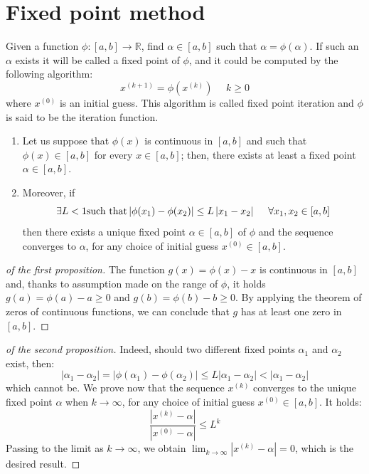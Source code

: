 \documentclass[12pt, a4paper]{report}
\begin{document}
    \section{Fixed point method}
    Given a function $\phi:[a,b] \rightarrow \mathbb{R}$, find $\alpha \in [a,b]$ such that $\alpha=\phi(\alpha)$. If such an $\alpha$ exists it will be called a fixed point of 
    $\phi$, and it could be computed by the following algorithm: 
    \[x^{(k+1)}=\phi(x^{(k)}) \:\:\:\:\:\: k \geq 0\]
    where $x^{(0)}$ is an initial guess. This algorithm is called fixed point iteration and $\phi$ is said to be the iteration function. 
    \begin{theorem}
        \begin{enumerate}
            \item Let us suppose that $\phi(x)$ is continuous in $[a,b]$ and such that $\phi(x) \in [a,b]$ for every $x \in [a,b]$; then, there exists at least a fixed point 
                $\alpha \in [a,b]$.
            \item Moreover, if 
                \[\exists L < 1 \textnormal{such that} \left\lvert \phi(x_1)-\phi(x_2) \right\rvert \leq L\left\lvert x_1-x_2 \right\rvert  \:\:\:\:\:\: \forall x_1,x_2 \in [a,b]\]
                then there exists a unique fixed point $\alpha \in [a,b]$ of $\phi$ and the sequence converges to $\alpha$, for any choice of initial guess $x^{(0)} \in [a,b]$.
        \end{enumerate}
    \end{theorem}
    \begin{proof}[of the first proposition]
        The function $g(x)= \phi(x)-x$ is continuous in $[a,b]$ and, thanks to assumption made on the range of $\phi$, it holds $g(a) = \phi(a)-a \geq 0$ and $g(b) = \phi(b)-b \geq 0$.
        By applying the theorem of zeros of continuous functions, we can conclude that $g$ has at least one zero in $[a,b]$. 
    \end{proof}
    \begin{proof}[of the second proposition]
        Indeed, should two different fixed points $\alpha_1$ and $\alpha_2$ exist, then: 
        \[\left\lvert \alpha_1-\alpha_2 \right\rvert = \left\lvert \phi(\alpha_1)-\phi(\alpha_2) \right\rvert \leq L \left\lvert \alpha_1-\alpha_2 \right\rvert < 
        \left\lvert \alpha_1-\alpha_2 \right\rvert\]
        which cannot be. We prove now that the sequence $x^{(k)}$ converges to the unique fixed point $\alpha$ when $k \rightarrow \infty$, for any choice of initial guess $x^{(0)} 
        \in [a,b]$. It holds: 
        \[\dfrac{\left\lvert x^{(k)}-\alpha \right\rvert}{\left\lvert x^{(0)}-\alpha \right\rvert} \leq L^k\]
        Passing to the limit as $k \rightarrow \infty$, we obtain $\lim_{k \rightarrow \infty}{\left\lvert x^{(k)}-\alpha \right\rvert}=0$, which is the desired result. 
    \end{proof}
\end{document}
